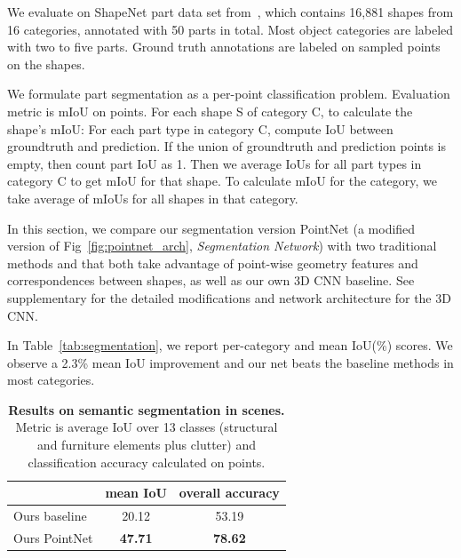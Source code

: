 We evaluate on ShapeNet part data set from~\cite{Yi16}, which contains 16,881 shapes from 16 categories, annotated with 50 parts in total. Most object categories are labeled with two to five parts. Ground truth annotations are labeled on sampled points on the shapes.

We formulate part segmentation as a per-point classification problem. Evaluation metric is mIoU on points. For each shape S of category C, to calculate the shape's mIoU: For each part type in category C, compute IoU between groundtruth and prediction. If the union of groundtruth and prediction points is empty, then count part IoU as 1. Then we average IoUs for all part types in category C to get mIoU for that shape. To calculate mIoU for the category, we take average of mIoUs for all shapes in that category. 

In this section, we compare our segmentation version PointNet (a modified version of Fig~\ref{fig:pointnet_arch}, \textit{Segmentation Network}) with two traditional methods \cite{Wu2014248} and \cite{Yi16} that both take advantage of point-wise geometry features and correspondences between shapes, as well as our own 3D CNN baseline.
See supplementary for the detailed modifications and network architecture for the 3D CNN.

In Table~\ref{tab:segmentation}, we report per-category and mean IoU(\%) scores. We observe a 2.3\% mean IoU improvement and our net beats the baseline methods in most categories.


\begin{table}[b!]
    \centering
    \small
    \begin{tabular}[width=\linewidth]{l|c|c}
    \hline
    ~             & mean IoU  & overall accuracy \\ \hline
    Ours baseline          &  20.12 & 53.19    \\ \hline
    Ours PointNet          & \textbf{47.71} & \textbf{78.62}  \\ \hline
    \end{tabular}
    \caption{\textbf{Results on semantic segmentation in scenes.} Metric is average IoU over 13 classes (structural and furniture elements plus clutter) and classification accuracy calculated on points. }
    \label{tab:semantic_segmentation}
\end{table}


